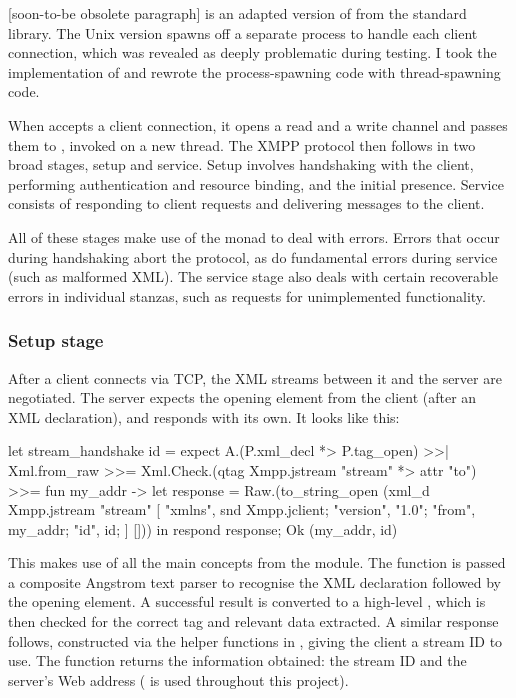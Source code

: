 \documentclass[12pt,a4paper,twoside,openright]{report}
\begin{document}
{[soon-to-be obsolete paragraph]
 is an adapted version of  from the standard library. The Unix version spawns off a separate process to handle each client connection, which was revealed as deeply problematic during testing. I took the implementation of  and rewrote the process-spawning code with thread-spawning code.

When  accepts a client connection, it opens a read and a write channel and passes them to , invoked on a new thread. The XMPP protocol then follows in two broad stages, setup and service. Setup involves handshaking with the client, performing authentication and resource binding, and the initial presence. Service consists of responding to client requests and delivering messages to the client.

All of these stages make use of the  monad to deal with errors. Errors that occur during handshaking abort the protocol, as do fundamental errors during service (such as malformed XML). The service stage also deals with certain recoverable errors in individual stanzas, such as requests for unimplemented functionality.

\subsubsection{Setup stage}\label{sec:server-setup}
After a client connects via TCP, the XML streams between it and the server are negotiated. The server expects the  opening element from the client (after an XML declaration), and responds with its own. It looks like this:

\begin{ocaml}
let stream_handshake id =
  expect A.(P.xml_decl *> P.tag_open) >>| Xml.from_raw >>=
    Xml.Check.(qtag Xmpp.jstream "stream" *> attr "to") >>= fun my_addr ->
  let response = Raw.(to_string_open (xml_d Xmpp.jstream "stream" [
    "xmlns", snd Xmpp.jclient;
    "version", "1.0"; "from", my_addr; "id", id;
  ] []))
  in respond response; Ok (my_addr, id)
\end{ocaml}

This makes use of all the main concepts from the  module. The  function is passed a composite Angstrom text parser to recognise the XML declaration followed by the opening  element. A successful result is converted to a high-level , which is then checked for the correct tag and relevant data extracted. A similar response follows, constructed via the helper functions in , giving the client a stream ID to use. The function returns the information obtained: the stream ID and the server's Web address ( is used throughout this project).

}
\end{document}
